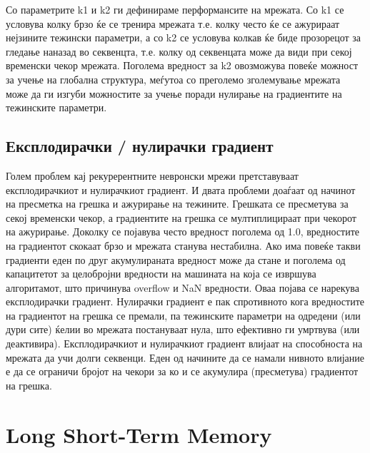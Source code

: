 Со параметрите k1 и k2 ги дефинираме перформансите на мрежата. Со k1 се условува колку брзо ќе се тренира мрежата т.е. колку често ќе се ажурираат нејзините тежински параметри, а со k2 се условува колкав ќе биде прозорецот за гледање наназад во секвенцта, т.е. колку од секвенцата може да види при секој временски чекор мрежата. Поголема вредност за k2 овозможува повеќе можност за учење на глобална структура, меѓутоа со преголемо зголемување мрежата може да ги изгуби можностите за учење поради нулирање на градиентите на тежинските параметри.

\subsection{Експлодирачки / нулирачки градиент}

Голем проблем кај рекурерентните невронски мрежи претставуваат експлодирачкиот и нулирачкиот градиент. И двата проблеми доаѓаат од начинот на пресметка на грешка и ажурирање на тежините. Грешката се пресметува за секој временски чекор, а градиентите на грешка се мултиплицираат при чекорот на ажурирање. Доколку се појавува често вредност поголема од 1.0, вредностите на градиентот скокаат брзо и мрежата станува нестабилна. Ако има повеќе такви градиенти еден по друг акумулираната вредност може да стане и поголема од капацитетот за целобројни вредности на машината на која се извршува алгоритамот, што причинува overflow и NaN вредности. Оваа појава се нарекува експлодирачки градиент. Нулирачки градиент е пак спротивното кога вредностите на градиентот на грешка се премали, па тежинските параметри на одредени (или дури сите) ќелии во мрежата постануваат нула, што ефективно ги умртвува (или деактивира). Експлодирачкиот и нулирачкиот градиент влијаат на способноста на мрежата да учи долги секвенци. Еден од начините да се намали нивното влијание е да се ограничи бројот на чекори за ко    и се акумулира (пресметува) градиентот на грешка.

\section{Long Short-Term Memory}

